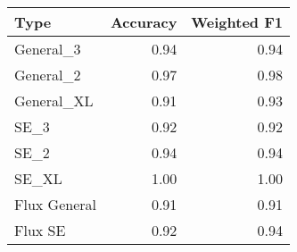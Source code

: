 \begin{tabular}{lrr}
\toprule
Type & Accuracy & Weighted F1 \\
\midrule
General_3 & 0.94 & 0.94 \\
General_2 & 0.97 & 0.98 \\
General_XL & 0.91 & 0.93 \\
SE_3 & 0.92 & 0.92 \\
SE_2 & 0.94 & 0.94 \\
SE_XL & 1.00 & 1.00 \\
Flux General & 0.91 & 0.91 \\
Flux SE & 0.92 & 0.94 \\
\bottomrule
\end{tabular}
